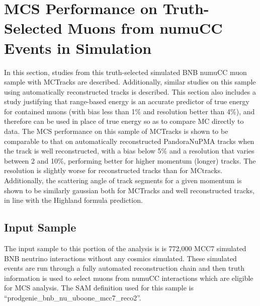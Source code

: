 
\section{MCS Performance on Truth-Selected Muons from numuCC Events in Simulation}\label{MCBNB_performance_section}


In this section, studies from this truth-selected simulated BNB numuCC muon sample with {\sc MCTracks} are described. Additionally, similar studies on this sample using automatically reconstructed tracks is described. This section also includes a study justifying that range-based energy is an accurate predictor of true energy for contained muons (with bias less than 1\% and resolution better than 4\%), and therefore can be used in place of true energy so as to compare MC directly to data. The MCS performance on this sample of {\sc MCTracks} is shown to be comparable to that on automatically reconstructed PandoraNuPMA tracks when the track is well reconstructed, with a bias below 5\% and a resolution that varies between 2 and 10\%, performing better for higher momentum (longer) tracks. The resolution is slightly worse for reconstructed tracks than for {\sc MCtracks}. Additionally, the scattering angle of track segments for a given momentum is shown to be similarly gaussian both for {\sc MCTracks} and well reconstructed tracks, in line with the Highland formula prediction.

\subsection{Input Sample}\label{MCBNB_input_sample_section}
The input sample to this portion of the analysis is is 772,000 MCC7 simulated BNB neutrino interactions without any cosmics simulated. These simulated events are run through a fully automated reconstruction chain and then truth information is used to select muons from numuCC interactions which are eligible for MCS analysis. The SAM definition used for this sample is ``prodgenie\_bnb\_nu\_uboone\_mcc7\_reco2''.


